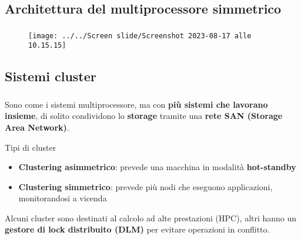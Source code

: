 \documentclass{beamer}
\newenvironment{mainframe}{
	\begin{frame}
		\frametitle{\insertsubsection}
		\framesubtitle{\insertsection}
	}{
	\end{frame}
}
\begin{document}
\subsection{Architettura del multiprocessore simmetrico}
\begin{mainframe}
	\begin{figure}
		\centering
		\texttt{[image: ../../Screen slide/Screenshot 2023-08-17 alle 10.15.15]}
	\end{figure}
\end{mainframe}
\subsection{Sistemi cluster}
\begin{mainframe}
	Sono come i sistemi multiprocessore, ma con \textbf{più sistemi che lavorano insieme}, di solito condividono lo \textbf{storage} tramite una \textbf{rete SAN (Storage Area Network)}.
		\begin{block}{Tipi di cluster}
		\begin{itemize}
			\item \textbf{Clustering asimmetrico}: prevede una macchina in modalità \textbf{hot-standby}
			\item \textbf{Clustering simmetrico}: prevede più nodi che eseguono applicazioni, monitorandosi a vicenda
		\end{itemize}
		Alcuni cluster sono destinati al calcolo ad alte prestazioni (HPC), altri hanno un \textbf{gestore di lock distribuito (DLM)} per evitare operazioni in conflitto.
	\end{block}
	\end{mainframe}
\end{document}

